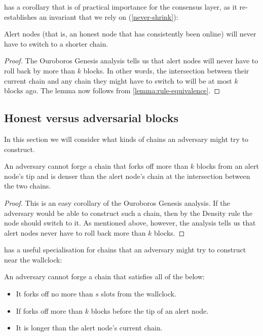  has a corollary that is of practical importance
for the consensus layer, as it re-establishes an invariant that we rely on
(\cref{never-shrink}):

\begin{lemma}
Alert nodes (that is, an honest node that has consistently been online)
will never have to switch to a shorter chain.
\end{lemma}

\begin{proof}
The Ouroboros Genesis analysis \cite{cryptoeprint:2018:378} tells us that
alert nodes will never have to roll back by more than $k$ blocks. In other
words, the intersection between their current chain and any chain they might
have to switch to will be at most $k$ blocks ago. The lemma now follows
from \cref{lemma:rule-equivalence}.
\end{proof}

\subsection{Honest versus adversarial blocks}

In this section we will consider what kinds of chains an adversary might try to
construct.

\begin{lemma}
\label{lemma:adversarial-before-k}
An adversary cannot forge a chain that forks off more than $k$ blocks from an
alert node's tip and is denser than the alert node's chain at the intersection
between the two chains.
\end{lemma}

\begin{proof}
This is an easy corollary of the Ouroboros Genesis analysis. If the adversary
would be able to construct such a chain, then by the Density rule the node
should switch to it. As mentioned above, however, the analysis tells us that
alert nodes never have to roll back more than $k$ blocks.
\end{proof}

 has a useful specialisation for chains that an
adversary might try to construct near the wallclock:

\begin{lemma}
\label{lemma:adversarial-within-s}
An adversary cannot forge a chain that satisfies all of the below:
%
\begin{itemize}
\item It forks off no more than $s$ slots from the wallclock.
\item If forks off more than $k$ blocks before the tip of an alert node.
\item It is longer than the alert node's current chain.
\end{itemize}
\end{lemma}

